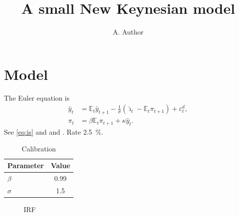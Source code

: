 \documentclass[12pt]{article}
\begin{document}
\title{A small New Keynesian model}\author{A. Author}\maketitle
\section{Model}\label{sec:model}
The Euler equation is
\begin{align}
 \hat{y}_t &= \mathbb{E}_t \hat{y}_{t+1} - \frac{1}{\sigma}\left(\hat{\imath}_t - \mathbb{E}_t \pi_{t+1}\right) + \varepsilon^d_t, \label{eq:is}\\
 \pi_t &= \beta \mathbb{E}_t \pi_{t+1} + \kappa \hat{y}_t. \label{eq:nkpc}
\end{align}
See \cref{eq:is} and \citet{gali2015} and \citep{smets2007}. Rate \qty{2.5}{\percent}.
\begin{table}[H]\centering\begin{tabular}{lS[table-format=1.3]}\toprule Parameter & {Value}\\\midrule $\beta$ & 0.99\\ $\sigma$ & 1.5\\\bottomrule\end{tabular}\caption{Calibration}\end{table}
\begin{figure}[H]\centering
{}\caption{IRF}\end{figure}


\end{document}
